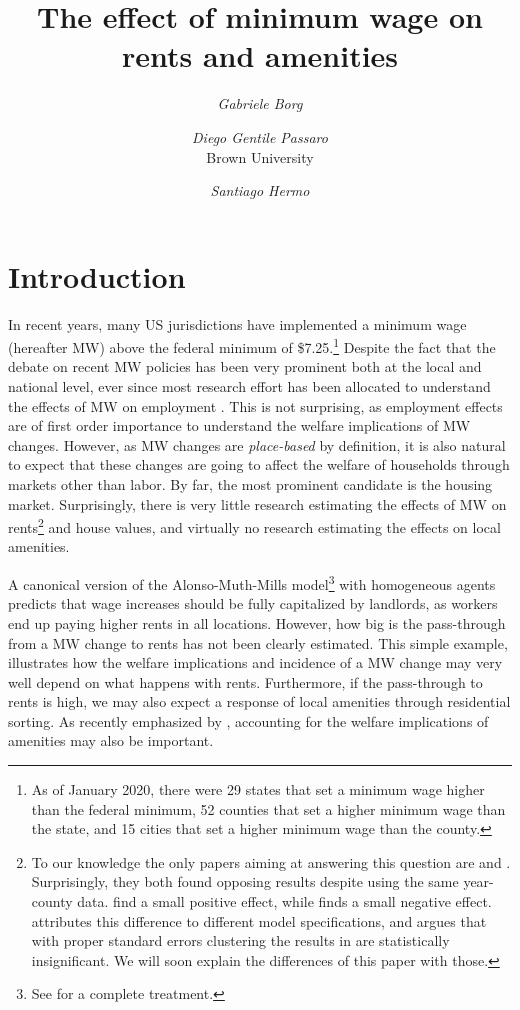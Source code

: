 \documentclass{article}
\title{The effect of minimum wage on rents and amenities}
\author{\textit{Gabriele Borg} \and
    \textit{Diego Gentile Passaro} \\	\small Brown University
    \and \textit{Santiago Hermo}}
\begin{document}
	\maketitle
	
\section{Introduction}

In recent years, many US jurisdictions have implemented a minimum wage (hereafter MW) above the federal minimum of \$7.25.\footnote{As of January 2020, there were 29 states that set a minimum wage higher than the federal minimum, 52 counties that set a higher minimum wage than the state, and 15 cities that set a higher minimum wage than the county.} Despite the fact that the debate on recent MW policies has been very prominent both at the local and national level, ever since \textcite{card2000minimum} most research effort has been allocated to understand the effects of MW on employment \parencite{neumark2006minimum,dube2010minimum,dube2016minimum}. This is not surprising, as employment effects are of first order importance to understand the welfare implications of MW changes. However, as MW changes are \textit{place-based} by definition, it is also natural to expect that these changes are going to affect the welfare of households through markets other than labor. By far, the most prominent candidate is the housing market. Surprisingly, there is very little research estimating the effects of MW on rents\footnote{To our knowledge the only papers aiming at answering this question are \textcite{yamagishi2019minimum} and \textcite{tidemann2018mw}. Surprisingly, they both found opposing results despite using the same year-county data. \textcite{yamagishi2019minimum} find a small positive effect, while \textcite{tidemann2018mw} finds a small negative effect. \textcite{yamagishi2019minimum} attributes this difference to different model specifications, and argues that with proper standard errors clustering the results in \textcite{tidemann2018mw} are statistically insignificant. We will soon explain the differences of this paper with those.} and house values, and virtually no research estimating the effects on local amenities. 

 A canonical version of the Alonso-Muth-Mills model\footnote{See \textcite{brueckner1987structure} for a complete treatment.} with homogeneous agents predicts that wage increases should be fully capitalized by landlords, as workers end up paying higher rents in all locations. However, how big is the pass-through from a MW change to rents has not been clearly estimated. This simple example, illustrates how the welfare implications and incidence of a MW change may very well depend on what happens with rents. Furthermore, if the pass-through to rents is high, we may also expect a response of local amenities through residential sorting. As recently emphasized by \textcite{diamond2016determinants}, accounting for the welfare implications of amenities may also be important.
 
\end{document}
